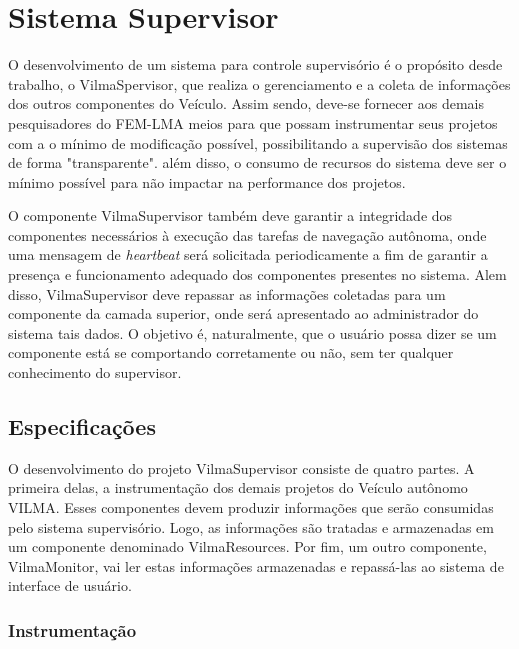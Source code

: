 \documentclass[conference]{IEEEtran}
\begin{document}

\section{Sistema Supervisor}\label{sec:supervisory_system}

O desenvolvimento de um sistema para controle supervisório é o propósito desde trabalho, o VilmaSpervisor, que realiza o gerenciamento e a coleta de informações dos outros componentes do Veículo. Assim sendo, deve-se fornecer aos demais pesquisadores do FEM-LMA meios para que possam instrumentar seus projetos com a o mínimo de modificação possível, possibilitando a supervisão dos sistemas de forma "transparente". além disso, o consumo de recursos do sistema deve ser o mínimo possível para não impactar na performance dos projetos.

O componente VilmaSupervisor também deve garantir a integridade dos componentes necessários à execução das tarefas de navegação autônoma, onde uma mensagem de \textit{heartbeat} será solicitada periodicamente a fim de garantir a presença e funcionamento adequado dos componentes presentes no sistema. Alem disso, VilmaSupervisor deve repassar as informações coletadas para um componente da camada superior, onde será apresentado ao administrador do sistema tais dados. O objetivo é, naturalmente, que o usuário possa dizer se um componente está se comportando corretamente ou não, sem ter qualquer conhecimento do supervisor.

\subsection{Especificações}\label{subsec:specifications}

O desenvolvimento do projeto VilmaSupervisor consiste de quatro partes. A primeira delas, a instrumentação dos demais projetos do Veículo autônomo VILMA. Esses componentes devem produzir informações que serão consumidas pelo sistema supervisório. Logo, as informações são tratadas e armazenadas em um componente denominado VilmaResources. Por fim, um outro componente, VilmaMonitor, vai ler estas informações armazenadas e repassá-las ao sistema de interface de usuário.

\subsubsection{Instrumentação}\label{subsec:instrumentation}
\end{document}

